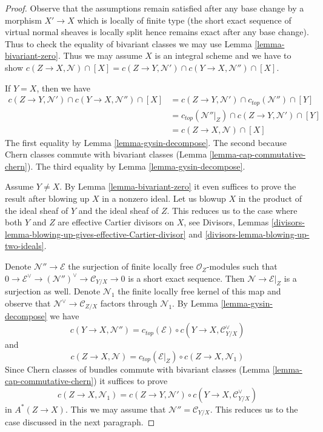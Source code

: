 \begin{proof}
Observe that the assumptions remain satisfied after any base change
by a morphism $X' \to X$ which is locally of finite type (the short
exact sequence of virtual normal sheaves is locally split hence
remains exact after any base change). Thus to check the
equality of bivariant classes we may use Lemma \ref{lemma-bivariant-zero}.
Thus we may assume $X$ is an integral scheme and we have to show
$c(Z \to X, \mathcal{N}) \cap [X] =
c(Z \to Y, \mathcal{N}') \cap c(Y \to X, \mathcal{N}'') \cap [X]$.

\medskip\noindent
If $Y = X$, then we have
\begin{align*}
c(Z \to Y, \mathcal{N}') \cap c(Y \to X, \mathcal{N}'') \cap [X]
& =
c(Z \to Y, \mathcal{N}') \cap c_{top}(\mathcal{N}'') \cap [Y] \\
& =
c_{top}(\mathcal{N}''|_Z) \cap c(Z \to Y, \mathcal{N}') \cap [Y] \\
& =
c(Z \to X, \mathcal{N}) \cap [X] 
\end{align*}
The first equality by Lemma \ref{lemma-gysin-decompose}.
The second because Chern classes commute with bivariant classes
(Lemma \ref{lemma-cap-commutative-chern}).
The third equality by Lemma \ref{lemma-gysin-decompose}.

\medskip\noindent
Assume $Y \not = X$. By Lemma \ref{lemma-bivariant-zero}
it even suffices to prove the result after blowing up $X$ in a nonzero ideal.
Let us blowup $X$ in the product of the ideal sheaf of $Y$ and the ideal
sheaf of $Z$. This reduces us to the case where both $Y$ and $Z$ are
effective Cartier divisors on $X$, see
Divisors, Lemmas
\ref{divisors-lemma-blowing-up-gives-effective-Cartier-divisor} and
\ref{divisors-lemma-blowing-up-two-ideals}.

\medskip\noindent
Denote $\mathcal{N}'' \to \mathcal{E}$ the surjection of finite locally
free $\mathcal{O}_Z$-modules such that
$0 \to \mathcal{E}^\vee \to (\mathcal{N}'')^\vee \to \mathcal{C}_{Y/X} \to 0$
is a short exact sequence. Then $\mathcal{N} \to \mathcal{E}|_Z$
is a surjection as well. Denote $\mathcal{N}_1$ the finite locally free kernel
of this map and observe that $\mathcal{N}^\vee \to \mathcal{C}_{Z/X}$
factors through $\mathcal{N}_1$.
By Lemma \ref{lemma-gysin-decompose} we have
$$
c(Y \to X, \mathcal{N}'') = c_{top}(\mathcal{E}) \circ
c(Y \to X, \mathcal{C}_{Y/X}^\vee)
$$
and
$$
c(Z \to X, \mathcal{N}) = c_{top}(\mathcal{E}|_Z) \circ
c(Z \to X, \mathcal{N}_1)
$$
Since Chern classes of bundles commute with bivariant classes
(Lemma \ref{lemma-cap-commutative-chern})
it suffices to prove
$$
c(Z \to X, \mathcal{N}_1) =
c(Z \to Y, \mathcal{N}') \circ c(Y \to X, \mathcal{C}_{Y/X}^\vee)
$$
in $A^*(Z \to X)$. This we may assume that $\mathcal{N}'' = \mathcal{C}_{Y/X}$.
This reduces us to the case discussed in the next paragraph.


\end{proof}
